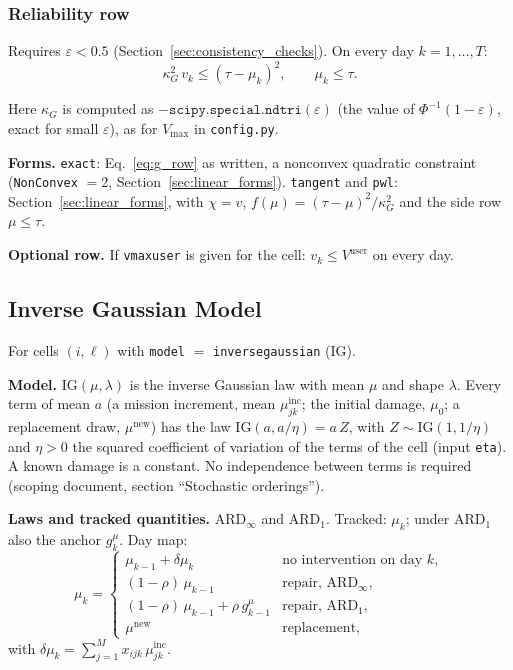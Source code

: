 \documentclass[11pt,a4paper]{article}
\theoremstyle{plain}
\theoremstyle{definition}
\newcommand{\ARDinf}{\mathrm{ARD}_{\infty}}
\newcommand{\ARDone}{\mathrm{ARD}_{1}}
\newcommand{\inc}{\mathrm{inc}}
\newcommand{\new}{\mathrm{new}}
\renewcommand{\_}{\textunderscore\allowbreak{}}
\begin{document}
\subsubsection{Reliability row}

Requires $\varepsilon < 0.5$ (Section~\ref{sec:consistency_checks}). On every day
$k = 1, \ldots, T$:
\begin{equation}
  \kappa_G^2\, v_k \leq (\tau - \mu_k)^2, \qquad \mu_k \leq \tau.
  \label{eq:g_row}
\end{equation}

Here $\kappa_G$ is computed as $-\texttt{scipy.special.ndtri}(\varepsilon)$ (the value
of $\Phi^{-1}(1 - \varepsilon)$, exact for small $\varepsilon$), as for
$V_{\max}$ in \texttt{config.py}.

\textbf{Forms.} \texttt{exact}: Eq.~\eqref{eq:g_row} as written, a nonconvex
quadratic constraint (\texttt{NonConvex} $= 2$, Section~\ref{sec:linear_forms}).
\texttt{tangent} and \texttt{pwl}: Section~\ref{sec:linear_forms}, with $\chi = v$,
$f(\mu) = (\tau - \mu)^2/\kappa_G^2$ and the side row $\mu \leq \tau$.

\textbf{Optional row.} If \texttt{v\_max\_user} is given for the cell:
$v_k \leq V^{\mathrm{user}}$ on every day.

\subsection{Inverse Gaussian Model}
\label{sec:dyn_ig}

For cells $(i,\ell)$ with \texttt{model} $=$ \texttt{inverse\_gaussian} (IG).

\textbf{Model.} $\mathrm{IG}(\mu, \lambda)$ is the inverse Gaussian law with mean
$\mu$ and shape $\lambda$. Every term of mean $a$ (a mission increment, mean
$\mu^{\inc}_{jk}$; the initial damage, $\mu_0$; a replacement draw, $\mu^{\new}$)
has the law $\mathrm{IG}(a, a/\eta) = a\,Z$, with $Z \sim \mathrm{IG}(1, 1/\eta)$
and $\eta > 0$ the squared coefficient of variation of the terms of the cell (input \texttt{eta}). A known damage is a
constant. No independence between terms is required (scoping document, section
``Stochastic orderings'').

\textbf{Laws and tracked quantities.} $\ARDinf$ and $\ARDone$. Tracked: $\mu_k$;
under $\ARDone$ also the anchor $g^{\mu}_k$. Day map:
\begin{equation}
  \mu_k = \begin{cases}
    \mu_{k-1} + \delta\mu_k & \text{no intervention on day } k,\\
    (1-\rho)\,\mu_{k-1} & \text{repair, } \ARDinf,\\
    (1-\rho)\,\mu_{k-1} + \rho\, g^{\mu}_{k-1} & \text{repair, } \ARDone,\\
    \mu^{\new} & \text{replacement,}
  \end{cases}
  \label{eq:ig_map}
\end{equation}
with $\delta\mu_k = \sum_{j=1}^{M} x_{ijk}\,\mu^{\inc}_{jk}$.
\end{document}
